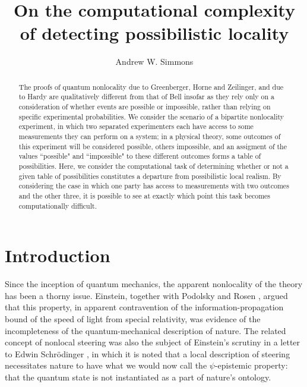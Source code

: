 \documentclass[reprint]{revtex4-1}
\theoremstyle{definition}
\begin{document}
\title{On the computational complexity of detecting possibilistic locality}
\author{Andrew W. Simmons}
\begin{abstract}
The proofs of quantum nonlocality due to Greenberger, Horne and Zeilinger, and due to Hardy are qualitatively different from that of Bell insofar as they rely only on a consideration of whether events are possible or impossible, rather than relying on specific experimental probabilities. We consider the scenario of a bipartite nonlocality experiment, in which two separated experimenters each have access to some measurements they can perform on a system; in a physical theory, some outcomes of this experiment will be considered possible, others impossible, and an assigment of the values ``possible" and ``impossible" to these different outcomes forms a table of possibilities. Here, we consider the computational task of determining whether or not a given table of possibilities constitutes a departure from possibilistic local realism. By considering the case in which one party has access to measurements with two outcomes and the other three, it is possible to see at exactly which point this task becomes computationally difficult.
\end{abstract}
\maketitle

\section{Introduction}
Since the inception of quantum mechanics, the apparent nonlocality of the theory has been a thorny issue. Einstein, together with Podolsky and Rosen \cite{EPR}, argued that this property, in apparent contravention of the information-propagation bound of the speed of light from special relativity, was evidence of the incompleteness of the quantum-mechanical description of nature. The related concept of nonlocal steering was also the subject of Einstein's scrutiny in a letter to Edwin Schr\"{o}dinger \cite{Eins1935-6-19}, in which it is noted that a local description of steering necessitates nature to have what we would now call the $\psi$-epistemic property: that the quantum state is not instantiated as a part of nature's ontology.
\end{document}
